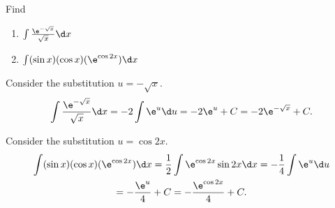 \begin{problem}
    Find 
    \begin{enumerate}
        \item $\int \frac{\e^{-\sqrt{x}}}{\sqrt{x}} \d x$
        \item $\int (\sin x)(\cos x)(\e^{\cos 2x}) \d x$
    \end{enumerate}
\end{problem}
\clearpage
\begin{solution}
    \begin{ppart}
        Consider the substitution $u = -\sqrt x$. \[\int \frac{\e^{-\sqrt{x}}}{\sqrt{x}} \d x = -2\int \e^{u} \d u = -2\e^u + C = -2\e^{-\sqrt{x}} + C.\]
    \end{ppart}
    \begin{ppart}
        Consider the substitution $u = \cos 2x$.
        \begin{gather*}
            \int (\sin x)(\cos x)(\e^{\cos 2x}) \d x = \frac12 \int \e^{\cos 2x} \sin 2x \d x = -\frac14 \int \e^u \d u \\
            = -\frac{\e^u }4 + C = -\frac{\e^{\cos 2x}}4 + C.
        \end{gather*}
    \end{ppart}
\end{solution}

